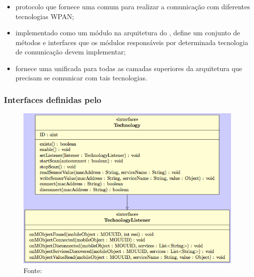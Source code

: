 \documentclass[aspectratio=169]{beamer}
\begin{document}
\begin{frame}
	\frametitle{\stwopa}
	\begin{itemize}
		\item protocolo que fornece uma \api comum para realizar a comunicação com diferentes tecnologias WPAN;

			\bigskip
			
		\item implementado como um módulo na arquitetura do \middleware, define um conjunto de métodos e interfaces que os módulos responsáveis por determinada tecnologia de comunicação devem implementar;

			\bigskip
			
		\item fornece uma \api unificada para todas as camadas superiores da arquitetura que precisam se comunicar com tais tecnologias.
			
	\end{itemize}
	
\end{frame}

\begin{frame}
	\frametitle{Interfaces definidas pelo \stwopa}
	\begin{figure}[htb]
		\centering
		\includegraphics[width=0.55\linewidth]{img/technology-interface.png}
		\caption{Fonte: \cite{talavera:et-al:2015}}
	\end{figure}
\end{frame}
\end{document}
